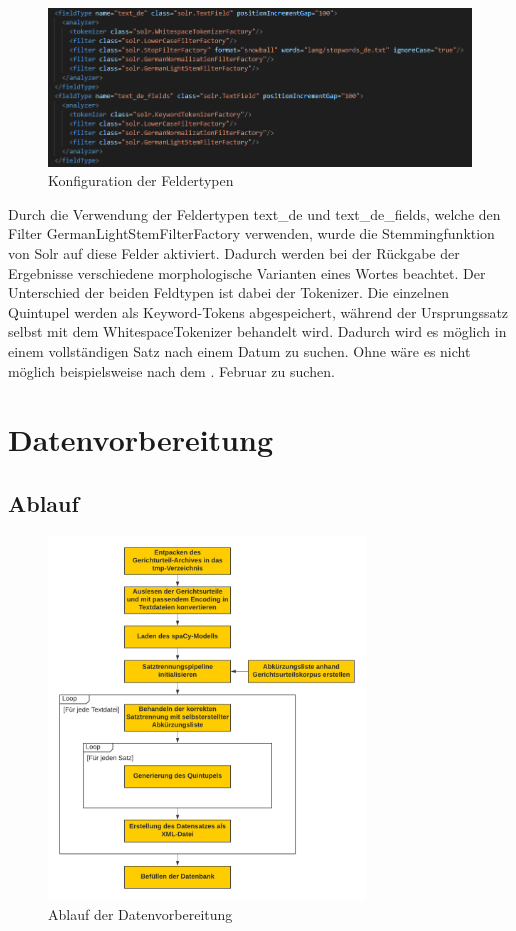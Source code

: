 \begin{figure}[H]
 \centering
 \includegraphics[width=\textwidth]{images/SolrFelderKonfigScreenshot.png}
 \caption{Konfiguration der Feldertypen}
 \label{fig:SolrSchema}
\end{figure}

Durch die Verwendung der Feldertypen text_de und text_de_fields, welche den Filter GermanLightStemFilterFactory verwenden, wurde die Stemmingfunktion von Solr auf diese Felder aktiviert. Dadurch werden bei der Rückgabe der Ergebnisse verschiedene morphologische Varianten eines Wortes beachtet. Der Unterschied der beiden Feldtypen ist dabei der Tokenizer. Die einzelnen Quintupel werden als Keyword-Tokens abgespeichert, während der Ursprungssatz selbst mit dem WhitespaceTokenizer behandelt wird. Dadurch wird es möglich in einem vollständigen Satz nach einem Datum zu suchen. Ohne wäre es nicht möglich beispielsweise nach dem . Februar\grqq{} zu suchen.


\chapter{Datenvorbereitung}
\section{Ablauf}
%
%
\begin{figure}[H]
 \centering
 \includegraphics[width=0.75\textwidth]{images/AblaufDatenvorbereitung.png}
 \caption{Ablauf der Datenvorbereitung}
 \label{fig:AblaufDatenvorbereitung}
\end{figure}

